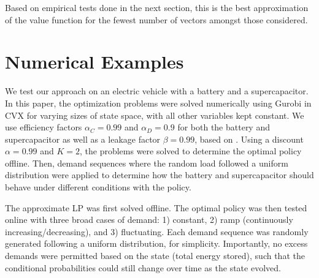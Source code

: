 \documentclass[conference]{IEEEtran}
\begin{document}
    Based on empirical tests done in the next section, this is the best approximation of the value function for the fewest number of vectors amongst those considered.
    

\section{Numerical Examples}
We test our approach on an electric vehicle with a battery and a supercapacitor. In this paper, the optimization problems were solved numerically using Gurobi in CVX for varying sizes of state space, with all other variables kept constant. We use efficiency factors $\alpha_{C}=0.99$ and $\alpha_{D}=0.9$ for both the battery and supercapacitor as well as a leakage factor $\beta=0.99$, based on \cite{su2013modeling}. Using a discount $\alpha=0.99$ and $K=2$, the problems were solved to determine the optimal policy offline. Then, demand sequences where the random load followed a uniform distribution were applied to determine how the battery and supercapacitor should behave under different conditions with the policy.

The approximate LP was first solved offline. The optimal policy was then tested online with three broad cases of demand: 1) constant, 2) ramp (continuously increasing/decreasing), and 3) fluctuating. Each demand sequence was randomly generated following a uniform distribution, for simplicity. Importantly, no excess demands were permitted based on the state (total energy stored), such that the conditional probabilities could still change over time as the state evolved.
\end{document}

